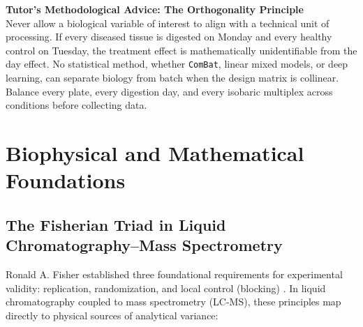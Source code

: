\documentclass[11pt,twoside,openright]{book}
\begin{document}
\FloatBarrier

\begin{notebox}
\textbf{Tutor's Methodological Advice: The Orthogonality Principle}\\
Never allow a biological variable of interest to align with a technical unit of processing. If every diseased tissue is digested on Monday and every healthy control on Tuesday, the treatment effect is mathematically unidentifiable from the day effect. No statistical method, whether \texttt{ComBat}, linear mixed models, or deep learning, can separate biology from batch when the design matrix is collinear. Balance every plate, every digestion day, and every isobaric multiplex across conditions before collecting data.
\end{notebox}

\section{Biophysical and Mathematical Foundations}

\subsection{The Fisherian Triad in Liquid Chromatography--Mass Spectrometry}

Ronald A. Fisher established three foundational requirements for experimental validity: replication, randomization, and local control (blocking) \cite{fisher1935design}. In liquid chromatography coupled to mass spectrometry (LC-MS), these principles map directly to physical sources of analytical variance:
\end{document}
